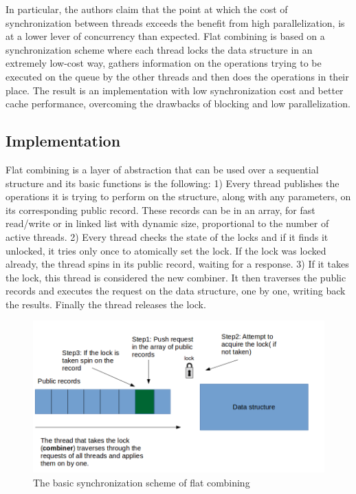 In particular, the authors claim that the point at which the cost of synchronization between threads exceeds the benefit from high parallelization, is at a lower lever of concurrency than expected. Flat combining is based on a synchronization scheme where each thread locks  the data structure in an extremely low-cost way, gathers information on the operations trying to be executed on the queue by the other threads and then does the operations in their place. The result is an implementation with low synchronization cost and better cache performance, overcoming the drawbacks of blocking and low parallelization.

\subsection{Implementation}

Flat combining is a layer of abstraction that can be used over a sequential structure and its basic functions is the following:
1) Every thread publishes the operations it is trying to perform on the structure, along with any parameters, on its corresponding public record. These records can be in an array, for fast read/write or in linked list with dynamic size, proportional to the number of active threads.
2) Every thread checks the state of the locks and if it finds it unlocked, it tries only once to atomically set the lock. If the lock was locked already, the thread spins in its public record, waiting for a response.
3) If it takes the lock, this thread is considered the new combiner. It then traverses the public records and executes the request on the data structure, one by one, writing back the results. Finally the thread releases the lock.


\begin{figure}
 \centering
  \includegraphics[scale=0.5]{flat_combining_basic.png}
\caption{The basic synchronization scheme of flat combining}
\label{flat_combining_basic}
\end{figure}

